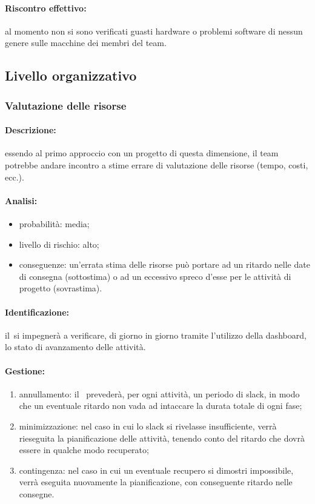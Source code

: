 \documentclass[../PianoProgetto.tex]{subfiles}
\begin{document}
	\paragraph*{Riscontro effettivo:} al momento non si sono verificati guasti hardware o problemi software di nessun genere sulle macchine dei membri del team.

\subsection{Livello organizzativo}

\subsubsection{Valutazione delle risorse}

	\paragraph*{Descrizione:} essendo al primo approccio con un progetto di questa dimensione, il team potrebbe andare incontro a stime errare di valutazione delle risorse (tempo, costi, ecc.).
	
	\paragraph*{Analisi:}
	\begin{itemize}
		\item probabilità: media;
		\item livello di rischio: alto;
		\item conseguenze: un'errata stima delle risorse può portare ad un ritardo nelle date di consegna (sottostima) o ad un eccessivo spreco d'esse per le attività di progetto (sovrastima).
	\end{itemize}
	
	\paragraph*{Identificazione:} il\responsabilediprogetto\ si impegnerà a verificare, di giorno in giorno tramite l'utilizzo della dashboard, lo stato di avanzamento delle attività.
	
	\paragraph*{Gestione:}
	\begin{enumerate}
		\item annullamento: il \responsabilediprogetto\ prevederà, per ogni attività, un periodo di slack, in modo che un eventuale ritardo non vada ad intaccare la durata totale di ogni fase;
		\item minimizzazione: nel caso in cui lo slack si rivelasse insufficiente, verrà rieseguita la pianificazione delle attività, tenendo conto del ritardo che dovrà essere in qualche modo recuperato;
		\item contingenza: nel caso in cui un eventuale recupero si dimostri impossibile, verrà eseguita nuovamente la pianificazione, con conseguente ritardo nelle consegne.
	\end{enumerate}	
	
\end{document}

